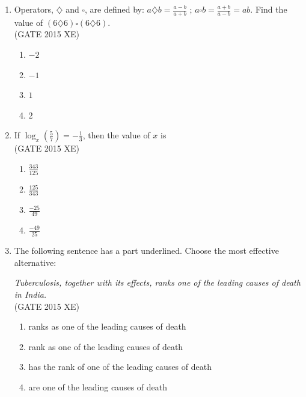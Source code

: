 \documentclass[journal,12pt,onecolumn]{IEEEtran}
\begin{document}
\begin{enumerate}
\item Operators, $\diamondsuit$ and $\square$, are defined by:  
$a\diamondsuit b = \frac{a-b}{a+b}$ ; \quad $a\square b = \frac{a+b}{a-b} = ab$.  
Find the value of $(6\diamondsuit 6) \square (6\diamondsuit 6)$.\\

\hfill{(GATE 2015 XE)} 
\begin{multicols}{4}
\begin{enumerate}
\item $-2$
\item $-1$
\item $1$
\item $2$
\end{enumerate}
\end{multicols}


\item If $\log_x \left(\frac{5}{7}\right) = -\frac{1}{3}$, then the value of $x$ is  \\

\hfill{(GATE 2015 XE)} 
\begin{multicols}{4}
\begin{enumerate}
\item $\frac{343}{125}$
\item $\frac{125}{343}$
\item $\frac{-25}{49}$
\item $\frac{-49}{25}$
\end{enumerate}
\end{multicols}

\item The following sentence has a part underlined. Choose the most effective alternative:  

\emph{Tuberculosis, together with its effects, ranks one of the leading causes of death in India.} \\
\hfill{(GATE 2015 XE)}

\begin{multicols}{2}
\begin{enumerate}
\item ranks as one of the leading causes of death
\item rank as one of the leading causes of death
\item has the rank of one of the leading causes of death
\item are one of the leading causes of death
\end{enumerate}
\end{multicols}


\end{enumerate}
\end{document}
